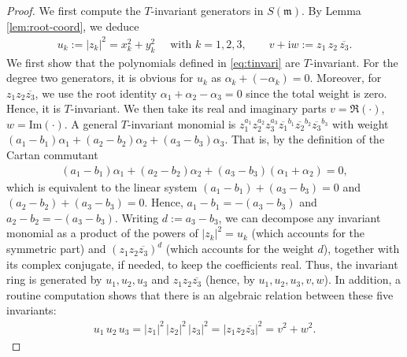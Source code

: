 \documentclass[11pt]{amsart}
\theoremstyle{definition}
\theoremstyle{plain}
\theoremstyle{conclusion}
\begin{document}
\begin{proof}
We first compute the $T$-invariant generators in $S(\mathfrak{m})$. By Lemma \ref{lem:root-coord}, we deduce  \begin{align}
    u_k:= |z_k|^2=x_k^2+y_k^2\quad \text{ with } k=1,2,3,\qquad v+\mathrm{i}w:=z_1\,z_2\,\overline{z_3} . \label{eq:tinvari}
\end{align} We first show that the polynomials defined in \eqref{eq:tinvari} are $T$-invariant. For the degree two generators, it is obvious for $u_k$ as $\alpha_k +  (-\alpha_k) = 0$. Moreover, for $z_1 z_2 \overline{z_3}$, we use the root identity $\alpha_1+\alpha_2-\alpha_3=0$ since the total weight is zero. Hence, it is $T$-invariant. We then take its real and imaginary parts $v=\Re(\cdot)$, $w=\mathrm{Im}(\cdot)$. A general $T$-invariant monomial is $z_1^{a_1}z_2^{a_2}z_3^{a_3}
\overline{z_1}^{b_1}\overline{z_2}^{b_2}\overline{z_3}^{b_3}$ with weight $(a_1-b_1)\alpha_1+(a_2-b_2)\alpha_2+(a_3-b_3)\alpha_3$. That is, by the definition of the Cartan commutant \begin{align*}
  (a_1-b_1)\alpha_1+(a_2-b_2)\alpha_2+(a_3-b_3)(\alpha_1+\alpha_2)=0,  
\end{align*} which is equivalent to the linear system $ (a_1-b_1)+(a_3-b_3)=0$ and  $ (a_2-b_2)+(a_3-b_3)=0$. Hence, $a_1-b_1=-(a_3-b_3)$ and $a_2-b_2=-(a_3-b_3)$. Writing $d:=a_3-b_3$, we can decompose any invariant monomial as a product of the powers of $|z_k|^2=u_k$ (which accounts for the symmetric part) and $(z_1z_2\overline{z_3})^d$ (which accounts for the weight $d$), together with its complex conjugate, if needed, to keep the coefficients real. Thus, the invariant ring is generated by $u_1,u_2,u_3$ and $z_1z_2\overline{z_3}$ (hence, by $u_1,u_2,u_3,v,w$).  In addition, a routine computation shows that there is an algebraic relation between these five invariants: \begin{align}
 u_1\,u_2\,u_3=|z_1|^2\,|z_2|^2\,|z_3|^2 =|z_1 z_2 \overline{z_3}|^2=v^2+w^2 . \label{eq:plrelation}
\end{align}   %


\end{proof}
\end{document}
